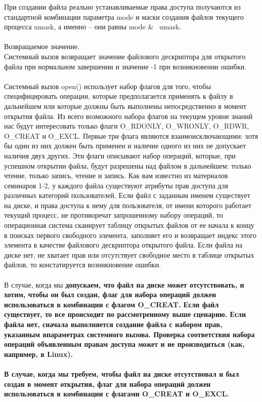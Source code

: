 \documentclass[a4paper]{article}
\begin{document}
При создании файла реально устанавливаемые права доступа получаются из стандартной комбинации параметра mode и маски создания файлов текущего процесса umask, а именно – они равны mode \& ~umask.\\\\
Возвращаемое значение. \\
Системный вызов возвращает значение файлового дескриптора для открытого файла при нормальном завершении и значение -1 при возникновении ошибки.\\\\
Системный вызов open() использует набор флагов для того, чтобы специфицировать операции, которые предполагается применять к файлу в дальнейшем или которые должны быть выполнены непосредственно в момент открытия файла. Из всего возможного набора флагов на текущем уровне знаний нас будут интересовать только флаги O\_RDONLY, O\_WRONLY, O\_RDWR, O\_CREAT и O\_EXCL. Первые три флага являются взаимоисключающими: хотя бы один из них должен быть применен и наличие одного из них не допускает наличия двух других. Эти флаги описывают набор операций, которые, при успешном открытии файла, будут разрешены над файлом в дальнейшем: только чтение, только запись, чтение и запись. Как вам известно из материалов семинаров 1-2, у каждого файла существуют атрибуты прав доступа для различных категорий пользователей. Если файл с заданным именем существует на диске, и права доступа к нему для пользователя, от имени которого работает текущий процесс, не противоречат запрошенному набору операций, то операционная система сканирует таблицу открытых файлов от ее начала к концу в поисках первого свободного элемента, заполняет его и возвращает индекс этого элемента в качестве файлового дескриптора открытого файла. Если файла на диске нет, не хватает прав или отсутствует свободное место в таблице открытых файлов, то констатируется возникновение ошибки.\\\\
В случае, когда мы \bf допускаем, \rm что файл на диске может отсутствовать, и хотим, чтобы он был создан, флаг для набора операций должен использоваться в комбинации с флагом O\_CREAT. Если файл существует, то все происходит по рассмотренному выше сценарию. Если файла нет, сначала выполняется создание файла с набором прав, указанным впараметрах системного вызова. Проверка соответствия набора операций объявленным правам доступа может и не производиться (как, например, в Linux).\\\\
В случае, когда мы \bf требуем, \rm чтобы файл на диске отсутствовал и был создан в момент открытия, флаг для набора операций должен использоваться в комбинации с флагами O\_CREAT и O\_EXCL.
\end{document}
